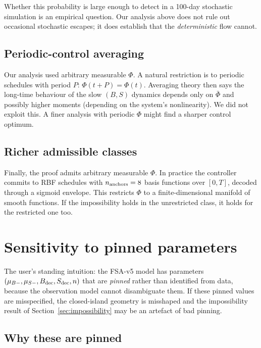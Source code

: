 \documentclass[11pt,a4paper]{article}
\theoremstyle{definition}
\begin{document}
Whether this probability is large enough to detect in a 100-day stochastic simulation is an empirical question. Our analysis above does not rule out occasional stochastic escapes; it does establish that the \emph{deterministic} flow cannot.

\subsection{Periodic-control averaging}

Our analysis used arbitrary measurable $\Phi$. A natural restriction is to periodic schedules with period $P$: $\Phi(t + P) = \Phi(t)$. Averaging theory then says the long-time behaviour of the slow $(B, S)$ dynamics depends only on $\bar\Phi$ and possibly higher moments (depending on the system's nonlinearity). We did not exploit this. A finer analysis with periodic $\Phi$ might find a sharper control optimum.

\subsection{Richer admissible classes}

Finally, the proof admits arbitrary measurable $\Phi$. In practice the controller commits to RBF schedules with $n_{\rm anchors} = 8$ basis functions over $[0, T]$, decoded through a sigmoid envelope. This restricts $\Phi$ to a finite-dimensional manifold of smooth functions. If the impossibility holds in the unrestricted class, it holds for the restricted one too.

\section{Sensitivity to pinned parameters} \label{sec:pinning-sensitivity}

The user's standing intuition: the FSA-v5 model has parameters $(\mu_{B-}, \mu_{S-}, B_{\rm dec}, S_{\rm dec}, n)$ that are \emph{pinned} rather than identified from data, because the observation model cannot disambiguate them. If these pinned values are misspecified, the closed-island geometry is misshaped and the impossibility result of Section~\ref{sec:impossibility} may be an artefact of bad pinning.

\subsection{Why these are pinned}
\end{document}
